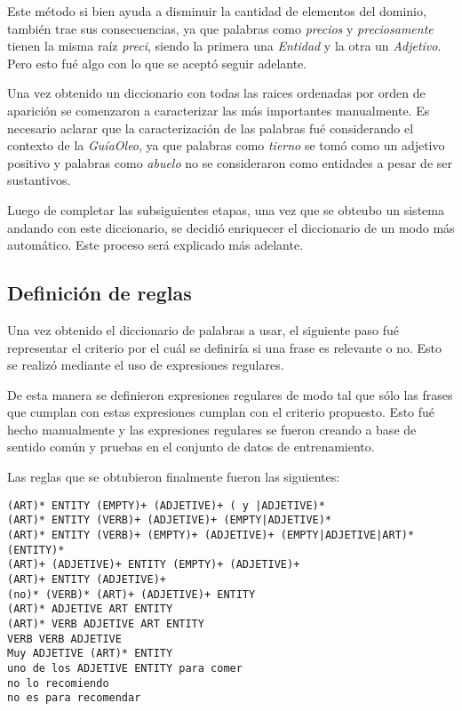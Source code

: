 Este método si bien ayuda a disminuir la cantidad de elementos del dominio, también trae sus consecuencias, ya que palabras como \emph{precios} y \emph{preciosamente} tienen la misma raíz \emph{preci}, siendo la primera una \emph{Entidad} y la otra un \emph{Adjetivo}. Pero esto fué algo con lo que se aceptó seguir adelante.

Una vez obtenido un diccionario con todas las raices ordenadas por orden de aparición se comenzaron a caracterizar las más importantes manualmente. Es necesario aclarar que la caracterización de las palabras fué considerando el contexto de la \emph{GuíaOleo}, ya que palabras como \emph{tierno} se tomó como un adjetivo positivo y palabras como \emph{abuelo} no se consideraron como entidades a pesar de ser sustantivos.

Luego de completar las subsiguientes etapas, una vez que se obteubo un sistema andando con este diccionario, se decidió enriquecer el diccionario de un modo más automático. Este proceso será explicado más adelante.


\subsection{Definición de reglas}

Una vez obtenido el diccionario de palabras a usar, el siguiente paso fué representar el criterio por el cuál se definiría si una frase es relevante o no. Esto se realizó mediante el uso de expresiones regulares.

De esta manera se definieron expresiones regulares de modo tal que sólo las frases que cumplan con estas expresiones cumplan con el criterio propuesto. Esto fué hecho manualmente y las expresiones regulares se fueron creando a base de sentido común y pruebas en el conjunto de datos de entrenamiento.

Las reglas que se obtubieron finalmente fueron las siguientes:

\begin{verbatim}
(ART)* ENTITY (EMPTY)+ (ADJETIVE)+ ( y |ADJETIVE)*
(ART)* ENTITY (VERB)+ (ADJETIVE)+ (EMPTY|ADJETIVE)*
(ART)* ENTITY (VERB)+ (EMPTY)+ (ADJETIVE)+ (EMPTY|ADJETIVE|ART)* (ENTITY)*
(ART)+ (ADJETIVE)+ ENTITY (EMPTY)+ (ADJETIVE)+
(ART)+ ENTITY (ADJETIVE)+
(no)* (VERB)* (ART)+ (ADJETIVE)+ ENTITY
(ART)* ADJETIVE ART ENTITY
(ART)* VERB ADJETIVE ART ENTITY
VERB VERB ADJETIVE
Muy ADJETIVE (ART)* ENTITY
uno de los ADJETIVE ENTITY para comer
no lo recomiendo
no es para recomendar
\end{verbatim}

